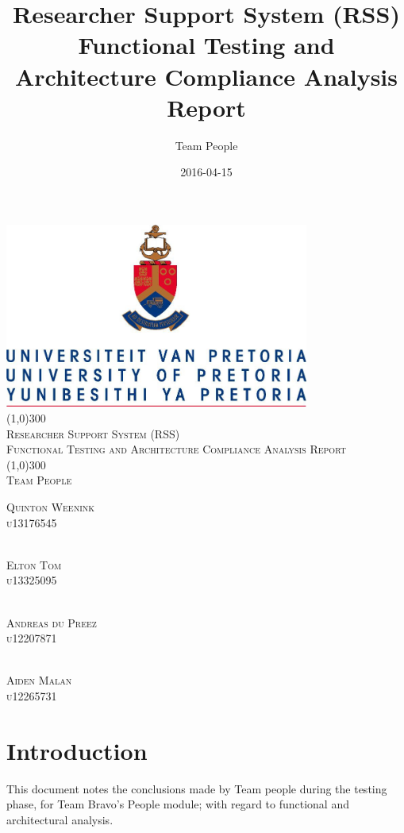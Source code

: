 \documentclass{article}
\title{
Researcher Support System (RSS)\\
Functional Testing and Architecture Compliance Analysis Report
}
\date{2016-04-15}
\author{Team People}
\begin{document}
\begin{titlepage}
	\begin{center}
		\includegraphics[width=10cm]{UP.jpg}  \\
		[1cm]
		\line(1,0){300} \\
		[0.3cm]
		\textsc{\Large
			Researcher Support System (RSS)\\
			Functional Testing and Architecture Compliance Analysis Report
		}\\
		[0.1cm]
		\line(1,0){300} \\
		[0.4cm]
		\textsc{\Large
			Team People
		} \\

	\end{center}
	\begin{flushright}
	\textsc{\Large
	Quinton Weenink\\ 
	u13176545\\
	}
	
	\textsc{\large\\
	Elton Tom\\ 
	u13325095\\ 
	}
	
	\textsc{\large\\
		Andreas du Preez\\ 
		u12207871\\ 
	}
	
	\textsc{\large\\
		Aiden Malan\\ 
		u12265731\\ 
	}
	
	\end{flushright}
\end{titlepage}

\tableofcontents
\thispagestyle{empty}
\cleardoublepage

\setcounter{page}{1}
\section{Introduction}
This document notes the conclusions made by Team people during the testing phase, for Team Bravo's People module; with regard to functional and architectural analysis. \\
\end{document}

